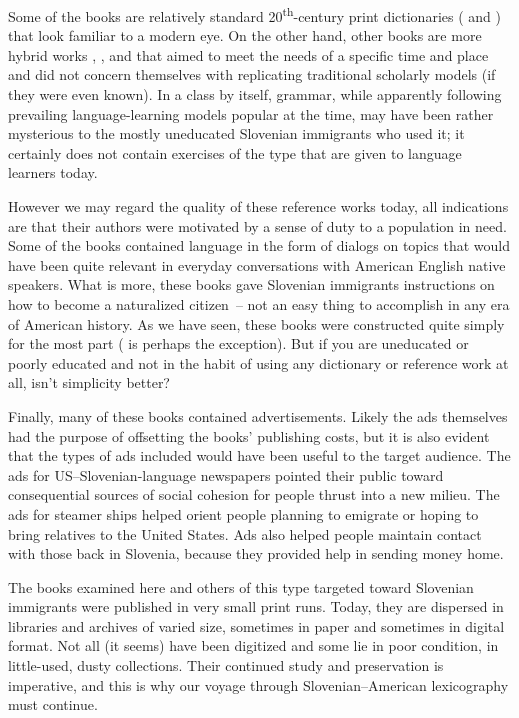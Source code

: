 \documentclass[output=paper,colorlinks,citecolor=brown,arabicfont,chinesefont]{langscibook}
\begin{document}
Some of the books are relatively standard 20\textsuperscript{th}-century print dictionaries (\citealt{Kern1919} and \citealt{Kosutnik1912}) that look familiar to a modern eye. On the other hand, other books are more hybrid works \citep{Kubelka1904}, \citep{Kubelka1912a}, and \citep{Kubelka1912b} that aimed to meet the needs of a specific time and place and did not concern themselves with replicating traditional scholarly models (if they were even known). In a class by itself, \citet{Jeram1895} grammar, while apparently following prevailing language-learning models popular at the time, may have been rather mysterious to the mostly uneducated Slovenian immigrants who used it; it certainly does not contain exercises of the type that are given to language learners today.

However we may regard the quality of these reference works today, all indications are that their authors were motivated by a sense of duty to a population in need. Some of the books contained language in the form of dialogs on topics that would have been quite relevant in everyday conversations with American English native speakers. What is more, these books gave Slovenian immigrants instructions on how to become a naturalized citizen~-- not an easy thing to accomplish in any era of American history. As we have seen, these books were constructed quite simply for the most part (\citealt{Jeram1895} is perhaps the exception). But if you are uneducated or poorly educated and not in the habit of using any dictionary or reference work at all, isn’t simplicity better?

Finally, many of these books contained advertisements. Likely the ads themselves had the purpose of offsetting the books’ publishing costs, but it is also evident that the types of ads included would have been useful to the target audience. The ads for US–Slovenian-language newspapers pointed their public toward consequential sources of social cohesion for people thrust into a new milieu. The ads for steamer ships helped orient people planning to emigrate or hoping to bring relatives to the United States. Ads also helped people maintain contact with those back in Slovenia, because they provided help in sending money home.

The books examined here and others of this type targeted toward Slovenian immigrants were published in very small print runs. Today, they are dispersed in libraries and archives of varied size, sometimes in paper and sometimes in digital format. Not all (it seems) have been digitized and some lie in poor condition, in little-used, dusty collections. Their continued study and preservation is imperative, and this is why our voyage through Slovenian–American lexicography must continue.
\end{document}

